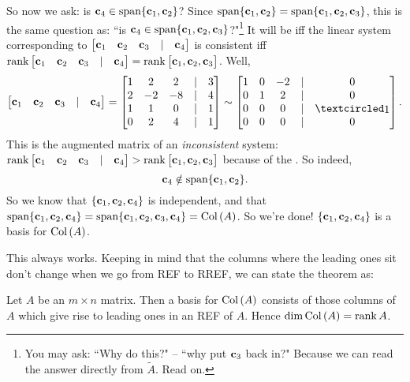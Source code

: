 \begin{myprob}
\begin{mysol}
So now we ask: is $\mathbf{c}_4\in \textrm{span}\{\mathbf{c}_1, \mathbf{c}_2\}$? Since $\textrm{span}\{\mathbf{c}_1, \mathbf{c}_2\}=\textrm{span}\{\mathbf{c}_1, \mathbf{c}_2, \mathbf{c}_3\}$, this is the same question as: ``is $\mathbf{c}_4\in \textrm{span}\{\mathbf{c}_1, \mathbf{c}_2, \mathbf{c}_3\}$?"\footnote{You may ask: ``Why do this?" -- ``why put $\mathbf{c}_3$ back in?" Because we can read the answer directly from $\tilde A$. Read on.} It will be iff the linear system corresponding to $\left[ \begin{matrix} \mathbf{c}_1&\mathbf{c}_2&\mathbf{c}_3&|&\mathbf{c}_4 \end{matrix} \right]$ is consistent iff $\operatorname{rank}\left[ \begin{matrix} \mathbf{c}_1&\mathbf{c}_2&\mathbf{c}_3&|&\mathbf{c}_4 \end{matrix} \right] =\operatorname{rank}\left[ \begin{matrix} \mathbf{c}_1, \mathbf{c}_2, \mathbf{c}_3 \end{matrix} \right]$. Well,
$$\mat{\cc_1&\cc_2&\cc_3&|&\cc_4}= \mat{
1&2&2&|&3\\2&-2&-8&|&4\\1&1&0&|&1\\0&2&4&|&1}\sim\mat{1 & 0 & -2 &|& 0\\ 0 & 1 & 2 &|& 0\\ 0 & 0 & 0 &|& \pivot\\ 0 & 0 & 0 &|& 0}.$$ This is the augmented matrix of an {\it inconsistent} system: $\operatorname{rank}\left[ \begin{matrix} \mathbf{c}_1&\mathbf{c}_2&\mathbf{c}_3&|&\mathbf{c}_4 \end{matrix} \right]>\operatorname{rank}\left[ \begin{matrix} \mathbf{c}_1, \mathbf{c}_2, \mathbf{c}_3 \end{matrix} \right]$ because of the . So indeed, $$\mathbf{c}_4\notin \textrm{span}\{\mathbf{c}_1, \mathbf{c}_2\}.$$
So we know that $\{\mathbf{c}_1, \mathbf{c}_2, \mathbf{c}_4 \}$ is independent, and that $\textrm{span}\{\mathbf{c}_1, \mathbf{c}_2, \mathbf{c}_4\}=\textrm{span}\{\mathbf{c}_1, \mathbf{c}_2, \mathbf{c}_3, \mathbf{c}_4\}=\operatorname{Col\,}(A)$. So we're done! $\{\mathbf{c}_1, \mathbf{c}_2, \mathbf{c}_4 \}$ is a basis for $\operatorname{Col\,}(A)$.
\end{mysol}\end{myprob}



 This always works. Keeping in mind that the columns where the leading ones sit don't change when we go from REF to RREF, we can state the theorem as:


\begin{theorem}\label{basisColA}
Let $A$ be an $m\times n$ matrix.  Then a basis for $\operatorname{Col\,}(A)$ consists of
those columns of $A$ which give rise to leading ones in an REF of $A$. Hence $\dim \operatorname{Col\,}(A)=\operatorname{rank} A$.
\end{theorem}


